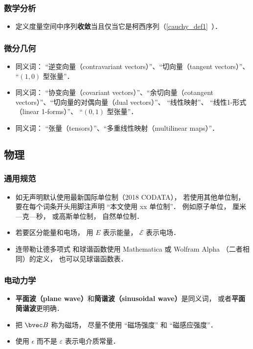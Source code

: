 \subsubsection{数学分析}
\begin{itemize}
\item 定义度量空间中序列\textbf{收敛}当且仅当它是柯西序列（\autoref{cauchy_def1}~）．
\end{itemize}

\subsubsection{微分几何}
\begin{itemize}
\item 同义词： “逆变向量（contravariant vectors）”、“切向量（tangent vectors）”、 “$(1, 0)$ 型张量”．
\item 同义词： “协变向量（covariant vectors）”、“余切向量（cotangent vectors）”、“切向量的对偶向量（dual vectors）”、 “线性映射”、 “线性1-形式（linear 1-forms）”、 “$(0, 1)$ 型张量”．
\item 同义词： “张量（tensors）”、“多重线性映射（multilinear maps）”．
\end{itemize}

\subsection{物理}
\subsubsection{通用规范}
\begin{itemize}
\item 如无声明默认使用最新国际单位制（2018 CODATA）， 若使用其他单位制， 要在每个词条开头用脚注声明 “本文使用 xx 单位制”． 例如原子单位， 厘米—克—秒， 或高斯单位制， 自然单位制．
\item 若要区分能量和电场， 用 $E$ 表示能量， $\mathcal E$ 表示电场．
\item 连带勒让德多项式 和球谐函数使用 Mathematica 或 Wolfram Alpha （二者相同）的定义， 也可以见球谐函数表．
\end{itemize}

\subsubsection{电动力学}
\begin{itemize}
\item \textbf{平面波（plane wave）}和\textbf{简谐波（sinusoidal wave）}是同义词， 或者\textbf{平面简谐波}更明确．
\item 把 $\bvec B$ 称为磁场， 尽量不使用 “磁场强度” 和 “磁感应强度”．
\item 使用 $\epsilon$ 而不是 $\varepsilon$ 表示电介质常量．
\end{itemize}

